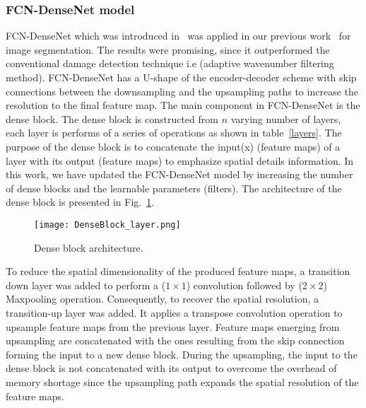 \subsubsection{FCN-DenseNet model}
FCN-DenseNet which was introduced in~\cite{Jegou} was applied in our previous work~\cite{Ijjeh2021} for image segmentation.
The results were promising, since it outperformed the conventional damage detection technique i.e (adaptive wavenumber filtering method). 
FCN-DenseNet has a U-shape of the encoder-decoder scheme with skip connections between the downsampling and the upsampling paths to increase the resolution to the final feature map.
The main component in FCN-DenseNet is the dense block.
The dense block is constructed from \(n\) varying number of layers, each layer is performs of a series of operations as shown in table~\ref{layers}.
The purpose of the dense block is to concatenate the input(x) (feature maps) of a layer  with its output (feature maps) to emphasize spatial details information.
In this work, we have updated the FCN-DenseNet model by increasing the number of dense blocks and the learnable parameters (filters).
The architecture of the dense block is presented in Fig.~\ref{dense_block}. 
\begin{figure} [h!]
	\begin{center}
		\texttt{[image: DenseBlock\_layer.png]}
	\end{center}
	\caption{Dense block architecture.} 
	\label{dense_block}
\end{figure}
To reduce the spatial dimensionality of the produced feature maps, a transition down layer was added to perform a (\(1\times 1\)) convolution followed by (\(2\times2\)) Maxpooling operation. 
Consequently, to recover the spatial resolution, a transition-up layer was added. 
It applies a transpose convolution operation to upsample feature maps from the previous layer.
Feature maps emerging from upsampling are concatenated with the ones resulting from the skip connection forming the input to a new dense block.
During the upsampling, the input to the dense block is not concatenated with its output to overcome the overhead of memory shortage since the upsampling path expands the spatial resolution of the feature maps. 
